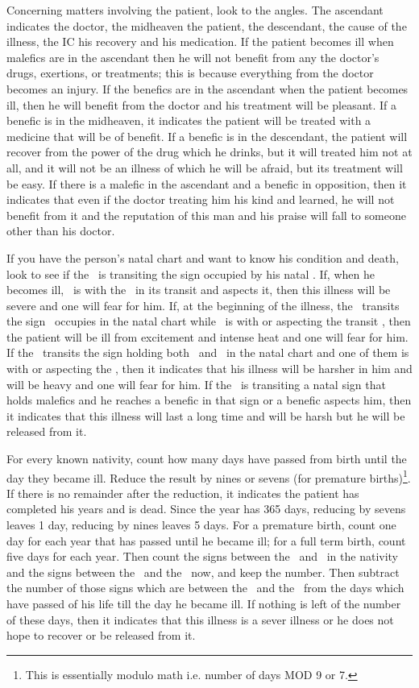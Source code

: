 Concerning matters involving the patient, look to the angles. The ascendant indicates the doctor, the midheaven the patient, the descendant, the cause of the illness, the IC his recovery and his medication. If the patient becomes ill when malefics are in the ascendant then he will not benefit from any the doctor's drugs, exertions, or treatments; this is because everything from the doctor becomes an injury. If the benefics are in the ascendant when the patient becomes ill, then he will benefit from the doctor and his treatment will be pleasant.  If a benefic is in the midheaven, it indicates the patient will be treated with a medicine that will be of benefit. If a benefic is in the descendant, the patient will recover from the power of the drug which he drinks, but it will treated him not at all, and it will not be an illness of which he will be afraid, but its treatment will be easy. If there is a malefic in the ascendant and a benefic in opposition, then it indicates that even if the doctor treating him his kind and learned, he will not benefit from it and the reputation of this man and his praise will fall to someone other than his doctor.

If you have the person's natal chart and want to know his condition and death, look to see if the \Moon\, is transiting the sign occupied by his natal \Saturn. If, when he becomes ill, \Saturn\, is with the \Moon\, in its transit and aspects it, then this illness will be severe and one will fear for him. If, at the beginning of the illness, the \Moon\, transits the sign \Mars\, occupies in the natal chart while \Mars\, is with or aspecting the transit \Moon, then the patient will be ill from excitement and intense heat and one will fear for him. If the \Moon\, transits the sign holding both \Saturn\, and \Mars\, in the natal chart and one of them is with or aspecting the \Moon, then it indicates that his illness will be harsher in him and will be heavy and one will fear for him. If the \Moon\, is transiting a natal sign that holds malefics and he reaches a benefic in that sign or a benefic aspects him, then it indicates that this illness will last a long time and will be harsh but he will be released from it. 

For every known nativity, count how many days have passed from birth until the day they became ill. Reduce the result by nines or sevens (for premature births)\footnote{This is essentially modulo math i.e. number of days MOD 9 or 7.}. If there is no remainder after the reduction, it indicates the patient has completed his years and is dead. Since the year has 365 days, reducing by sevens leaves 1 day, reducing by nines leaves 5 days. For a premature birth, count one day for each year that has passed until he became ill; for a full term birth, count five days for each year. Then count the signs between the \Sun\ and \Moon\ in the nativity and the signs between the \Sun\ and the \Moon\ now, and keep the number. Then subtract the number of those signs which are between the \Sun\ and the \Moon\ from the days which have passed of his life till the day he became ill. If nothing is left of the number of these days, then it indicates that this illness is a sever illness or he does not hope to recover or be released from it.

